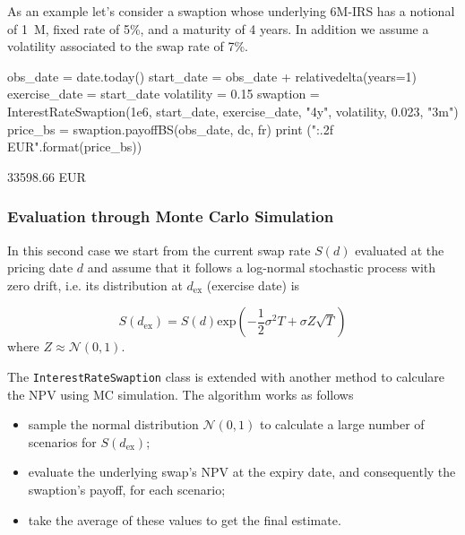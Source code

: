 As an example let's consider a swaption whose underlying 6M-IRS has a notional of 1~M, fixed rate of 5\%, and a maturity of 4 years. In addition we assume a volatility associated to the swap rate of 7\%.

\begin{ipython}
obs_date = date.today()
start_date = obs_date + relativedelta(years=1)
exercise_date = start_date
volatility = 0.15
swaption = InterestRateSwaption(1e6, start_date, exercise_date, "4y",
                                volatility, 0.023, "3m")
price_bs = swaption.payoffBS(obs_date, dc, fr)
print ("{:.2f} EUR".format(price_bs))
\end{ipython}
\begin{ioutput}
33598.66 EUR
\end{ioutput}

\subsubsection{Evaluation through Monte Carlo Simulation}
\label{evaluation-through-monte-carlo-simulation}

In this second case we start from the current swap rate $S(d)$ evaluated at the pricing date $d$ and assume that it follows a log-normal stochastic process with zero drift, i.e. its distribution at $d_{\mathrm{ex}}$ (exercise date) is 

\begin{equation*}
S(d_{\mathrm{ex}}) = S(d)\mathrm{exp}(-\frac{1}{2}\sigma^{2}T+\sigma Z\sqrt{T})
\end{equation*}
\noindent
where $Z\approx\mathcal{N}(0,1)$. %

\begin{finmarkets}
The \texttt{InterestRateSwaption} class is extended with another method to calculare the NPV using MC simulation.
The algorithm works as follows

\begin{itemize}
\tightlist
\item sample the normal distribution $\mathcal{N}(0, 1)$ to calculate a large number of scenarios for $S(d_{\mathrm{ex}})$;
\item evaluate the underlying swap's NPV at the expiry date, and consequently the swaption's payoff, for each scenario;
\item take the average of these values to get the final estimate.
\end{itemize}
\end{finmarkets}

